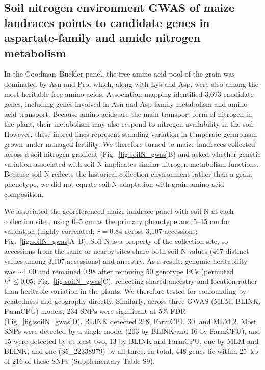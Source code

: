 \subsection{Soil nitrogen environment GWAS of maize landraces points to candidate genes in aspartate-family and amide nitrogen metabolism}

In the Goodman--Buckler panel, the free amino acid pool of the grain was dominated by Asn and Pro, which, along with Lys and Asp, were also among the most heritable free amino acids. Association mapping identified 3,693 candidate genes, including genes involved in Asn and Asp-family metabolism and amino acid transport. Because amino acids are the main transport form of nitrogen in the plant, their metabolism may also respond to nitrogen availability in the soil. However, these inbred lines represent standing variation in temperate germplasm grown under managed fertility. We therefore turned to maize landraces collected across a soil nitrogen gradient (Fig.~\ref{fig:soilN_gwas}B) and asked whether genetic variation associated with soil N implicates similar nitrogen-metabolism functions. Because soil N reflects the historical collection environment rather than a grain phenotype, we did not equate soil N adaptation with grain amino acid composition.

We associated the georeferenced maize landrace panel \citep{RomeroNavarro2017Landraces} with soil N at each collection site \citep{Poggio2021SoilGrids}, using 0--5 cm as the primary phenotype and 5--15 cm for validation (highly correlated; $r = 0.84$ across 3,107 accessions; Fig.~\ref{fig:soilN_gwas}A--B). Soil N is a property of the collection site, so accessions from the same or nearby sites share both soil N values (467 distinct values among 3,107 accessions) and ancestry. As a result, genomic heritability was $\sim$1.00 and remained 0.98 after removing 50 genotype PCs (permuted $h^2 \le 0.05$; Fig.~\ref{fig:soilN_gwas}C), reflecting shared ancestry and location rather than heritable variation in the plants. We therefore tested for confounding by relatedness and geography directly. Similarly, across three GWAS (MLM, BLINK, FarmCPU) models, 234 SNPs were significant at 5\% FDR (Fig.~\ref{fig:soilN_gwas}D). BLINK detected 218, FarmCPU 30, and MLM 2. Most SNPs were detected by a single model (203 by BLINK and 16 by FarmCPU), and 15 were detected by at least two, 13 by BLINK and FarmCPU, one by MLM and BLINK, and one (S5\_22338979) by all three. In total, 448 genes lie within 25~kb of 216 of these SNPs (Supplementary Table S9).

